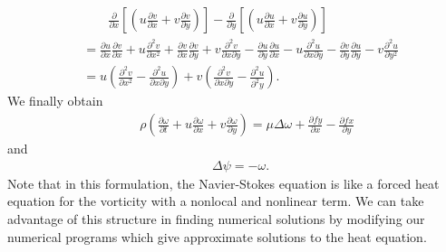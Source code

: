 \begin{align*}
&{}\hspace{2em}\frac{\partial }{\partial x} \left[\left( u\frac{\partial v}{\partial x} +v\frac{\partial v}{\partial y}\right) \right]
- \frac{\partial }{\partial y} \left[\left(u \frac{\partial u}{\partial x} +v\frac{\partial u}{\partial y}\right) \right]
\\&{}=\frac{\partial u}{\partial x}\frac{\partial v}{\partial x}+u\frac{\partial^2 v}{\partial x^2 } +\frac{\partial v}{\partial x}\frac{\partial v}{\partial y} + v\frac{\partial^2v }{\partial x \partial y}
-\frac{\partial u}{\partial y}\frac{\partial u}{\partial x} - u\frac{\partial^2u }{\partial x\partial y} -\frac{\partial v}{\partial y}\frac{\partial u}{\partial y} -v \frac{\partial^2u }{\partial y^2 }
\\&{}= u\left( \frac{\partial^2 v}{\partial x^2 } - \frac{\partial^2u }{\partial x\partial y} \right) + v\left( \frac{\partial^2 v}{\partial x \partial y } - \frac{\partial^2u }{\partial^2 y} \right). 
\end{align*}
We finally obtain
\begin{align} \label{eq:Ns2dStrVorA}
&{}\hspace{1em}\rho\left(\frac{\partial \omega}{\partial t} + u\frac{\partial \omega}{\partial x} + v\frac{\partial \omega }{\partial y}\right)
 =\mu\Delta\omega+\frac{\partial fy}{\partial x}- \frac{\partial fx}{\partial y} 
 \end{align}
and
\begin{align} \label{eq:Ns2dStrVorB}
&{}\Delta \psi = -\omega.
\end{align}
Note that in this formulation, the Navier-Stokes equation is like a forced heat equation for the vorticity with a nonlocal and nonlinear term. We can take advantage of this structure in finding numerical solutions by modifying our numerical programs which give approximate solutions to the heat equation.

